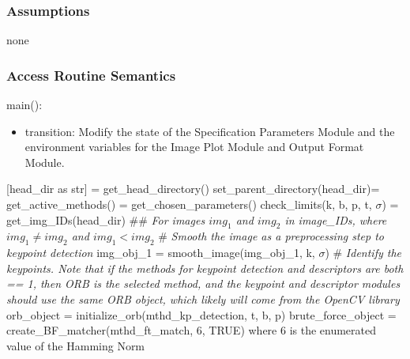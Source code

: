 \documentclass[12pt, titlepage]{article}
\begin{document}
\subsubsection{Assumptions}
none

\subsubsection{Access Routine Semantics}
\noindent main():
\begin{itemize}
\item transition: Modify the state of the Specification Parameters Module and the 
environment variables for the Image Plot Module and Output Format Module.
\end{itemize}
[head\_dir as str] = get\_head\_directory() \newline
set\_parent\_directory(head\_dir)\newline {} 
= get\_active\_methods() \newline \newline
[k, $\sigma$, t, b, p]
= get\_chosen\_parameters() \newline \newline
check\_limits(k, b, p, t, $\sigma$) \newline {} = get\_img\_IDs(head\_dir) \newline \newline
\#\# \textit{For images $img_{1}$ and $img_{2}$ in image\_IDs, where $img_{1} \neq img_{2}$ and $img_{1} < img_{2}$}\newline
\# \textit{Smooth the image as a preprocessing step to keypoint detection} \newline
img\_obj\_1 = smooth\_image(img\_obj\_1, k, $\sigma$) \newline \newline
\# \textit{Identify the keypoints. Note that if the methods for keypoint detection and 
descriptors are both == 1, then ORB is the selected method, and the keypoint and descriptor 
modules should use the same ORB object, which likely will come from the OpenCV library}\newline \newline
orb\_object = initialize\_orb(mthd\_kp\_detection, t, b, p) \newline
brute\_force\_object = create\_BF\_matcher(mthd\_ft\_match, 6, TRUE) where 6 is the enumerated value of the Hamming Norm \newline
\end{document}
